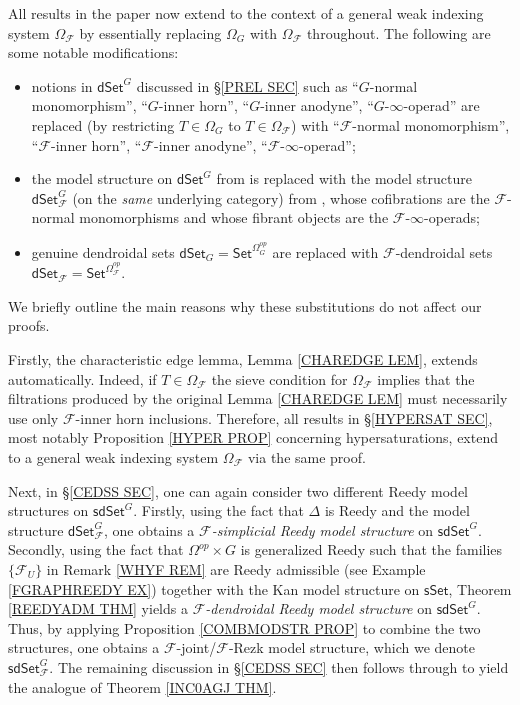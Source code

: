 \documentclass[a4paper,10pt
 ,draft
]{article}%
\begin{document}
All results in the paper now extend to the context of a general weak indexing system $\Omega_{\mathcal{F}}$
by essentially replacing $\Omega_G$ with $\Omega_{\mathcal{F}}$ throughout. The following are some notable modifications:
\begin{itemize}
\item notions in $\mathsf{dSet}^G$ discussed in \S \ref{PREL SEC} such as 
	``$G$-normal monomorphism'', ``$G$-inner horn'', ``$G$-inner anodyne'', ``$G$-$\infty$-operad'' are replaced
	(by restricting $T \in \Omega_{G}$ to $T \in \Omega_{\mathcal{F}}$) with
	``$\mathcal{F}$-normal monomorphism'', ``$\mathcal{F}$-inner horn'', ``$\mathcal{F}$-inner anodyne'', ``$\mathcal{F}$-$\infty$-operad'';
\item the model structure on $\mathsf{dSet}^G$ from 
\cite[Thm. 2.1]{Per18} is replaced with the model structure
$\mathsf{dSet}^G_{\mathcal{F}}$ (on the \textit{same} underlying category) from 
\cite[Thm. 2.2]{Per18},
whose cofibrations are the $\mathcal{F}$-normal monomorphisms
and whose fibrant objects are the $\mathcal{F}$-$\infty$-operads;
\item genuine dendroidal sets $\mathsf{dSet}_G = \mathsf{Set}^{\Omega_G^{op}}$ are replaced with
$\mathcal{F}$-dendroidal sets
	$\mathsf{dSet}_{\mathcal{F}} = \mathsf{Set}^{\Omega_{\mathcal{F}}^{op}}$.
\end{itemize}
We briefly outline the main reasons why these substitutions do not affect our proofs.

Firstly, the characteristic edge lemma, Lemma \ref{CHAREDGE LEM}, extends automatically. Indeed, if $T \in \Omega_{\mathcal{F}}$ the sieve condition for $\Omega_{\mathcal{F}}$ implies 
that the filtrations produced by the original 
Lemma \ref{CHAREDGE LEM} must necessarily use only 
$\mathcal{F}$-inner horn inclusions.
Therefore, all results in \S \ref{HYPERSAT SEC}, 
most notably Proposition \ref{HYPER PROP} concerning hypersaturations,
extend to a general weak indexing system $\Omega_{\mathcal{F}}$
via the same proof.

Next, in \S \ref{CEDSS SEC}, one can again consider two different Reedy model structures on 
$\mathsf{sdSet}^G$.
Firstly, using the fact that $\Delta$ is Reedy and the model structure $\mathsf{dSet}^G_{\mathcal{F}}$, one obtains a
\textit{$\mathcal{F}$-simplicial Reedy model structure} on
$\mathsf{sdSet}^G$.
Secondly, using the fact that $\Omega^{op} \times G$ is generalized Reedy such that the families 
$\{\mathcal{F}_U\}$ in Remark \ref{WHYF REM}
are Reedy admissible (see Example \ref{FGRAPHREEDY EX})
together with the Kan model structure on 
$\mathsf{sSet}$, Theorem \ref{REEDYADM THM} yields a 
\textit{$\mathcal{F}$-dendroidal Reedy model structure}
on $\mathsf{sdSet}^G$.
Thus, by applying Proposition \ref{COMBMODSTR PROP} to combine the two structures,
one obtains a $\mathcal{F}$-joint/$\mathcal{F}$-Rezk model structure, which we denote
$\mathsf{sdSet}^G_{\mathcal{F}}$.
The remaining discussion in \S \ref{CEDSS SEC} then follows through to yield the analogue of Theorem \ref{INC0AGJ THM}.
\end{document}
